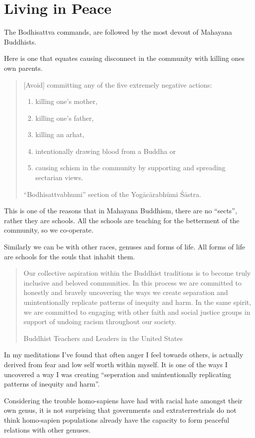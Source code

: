 
\chapter{Living in Peace}\label{peace}

The Bodhisattva commands, are followed by the most devout of Mahayana Buddhists.

Here is one that equates causing disconnect in the community with killing ones
own parents. 
\blockquote[``Bodhisattvabhumi'' section of the Yogācārabhūmi Śāstra.]{[Avoid] 
committing any of the five extremely negative actions: 
\begin{enumerate}
  \item killing one's mother, 
  \item killing one's father, 
  \item killing an arhat, 
  \item intentionally drawing blood from a Buddha or 
  \item causing schism in the community by supporting and spreading sectarian views. 
\end{enumerate}
}

This is one of the reasons that in Mahayana Buddhism, there are no ``sects'', 
rather they are schools. All the schools are teaching for the betterment of the
community, so we co-operate. 

Similarly we can be with other races, genuses and forms of life. All forms of
life are schools for the souls that inhabit them.

\blockquote[Buddhist Teachers and Leaders in the United States\cite{racial}]{Our
 collective aspiration within the Buddhist traditions is to become truly 
inclusive and beloved communities.  In this process we are committed to 
honestly and bravely uncovering the ways we create separation and 
unintentionally replicate patterns of inequity and harm.  In the same spirit, 
we are committed to engaging with other faith and social justice groups in 
support of undoing racism throughout our society.
}

In my meditations I've found that often anger I feel towards others, is actually
derived from fear and low self worth within myself. It is one of the ways I
uncovered a way I was creating ``seperation and unintentionally replicating
patterns of inequity and harm''.

Considering the trouble homo-sapiens have had with racial hate amongst their 
own genus, it is not surprising that governments and extraterrestrials do not 
think homo-sapien populations already have the capacity to form peaceful 
relations with other genuses.

